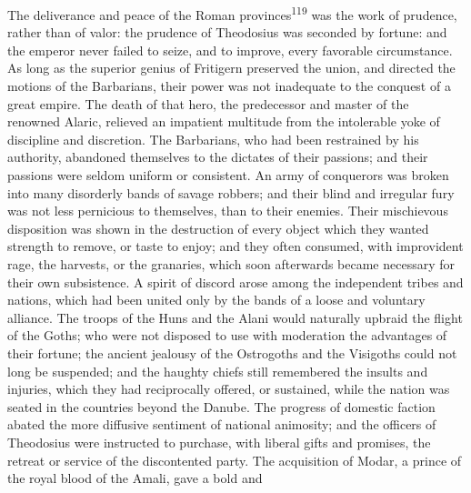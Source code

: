


The deliverance and peace of the Roman provinces\textsuperscript{119} was the work
of prudence, rather than of valor: the prudence of Theodosius was
seconded by fortune: and the emperor never failed to seize, and
to improve, every favorable circumstance. As long as the superior
genius of Fritigern preserved the union, and directed the motions
of the Barbarians, their power was not inadequate to the conquest
of a great empire. The death of that hero, the predecessor and
master of the renowned Alaric, relieved an impatient multitude
from the intolerable yoke of discipline and discretion. The
Barbarians, who had been restrained by his authority, abandoned
themselves to the dictates of their passions; and their passions
were seldom uniform or consistent. An army of conquerors was
broken into many disorderly bands of savage robbers; and their
blind and irregular fury was not less pernicious to themselves,
than to their enemies. Their mischievous disposition was shown in
the destruction of every object which they wanted strength to
remove, or taste to enjoy; and they often consumed, with
improvident rage, the harvests, or the granaries, which soon
afterwards became necessary for their own subsistence. A spirit
of discord arose among the independent tribes and nations, which
had been united only by the bands of a loose and voluntary
alliance. The troops of the Huns and the Alani would naturally
upbraid the flight of the Goths; who were not disposed to use
with moderation the advantages of their fortune; the ancient
jealousy of the Ostrogoths and the Visigoths could not long be
suspended; and the haughty chiefs still remembered the insults
and injuries, which they had reciprocally offered, or sustained,
while the nation was seated in the countries beyond the Danube.
The progress of domestic faction abated the more diffusive
sentiment of national animosity; and the officers of Theodosius
were instructed to purchase, with liberal gifts and promises, the
retreat or service of the discontented party. The acquisition of
Modar, a prince of the royal blood of the Amali, gave a bold and
